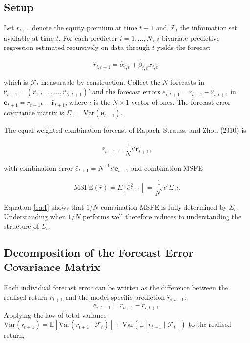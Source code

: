 \documentclass[a4paper,11pt]{article}
\begin{document}
\subsection{Setup}

Let $r_{t+1}$ denote the equity premium at time $t+1$ and $\mathcal{F}_t$ the information set available at time $t$. For each predictor $i = 1, \ldots, N$, a bivariate predictive regression estimated recursively on data through $t$ yields the forecast

\begin{equation*}
\hat{r}_{i,t+1} = \hat{\alpha}_{i,t} + \hat{\beta}_{i,t} x_{i,t},
\end{equation*}

\noindent which is $\mathcal{F}_t$-measurable by construction. Collect the $N$ forecasts in $\hat{\mathbf{r}}_{t+1} = (\hat{r}_{1,t+1}, \ldots, \hat{r}_{N,t+1})'$ and the forecast errors $e_{i,t+1} = r_{t+1} - \hat{r}_{i,t+1}$ in $\mathbf{e}_{t+1} = r_{t+1}\iota - \hat{\mathbf{r}}_{t+1}$, where $\iota$ is the $N \times 1$ vector of ones. The forecast error covariance matrix is $\Sigma_e = \mathrm{Var}(\mathbf{e}_{t+1})$.

The equal-weighted combination forecast of Rapach, Strauss, and Zhou (2010) is

\begin{equation*}
\bar{r}_{t+1} = \frac{1}{N} \iota' \hat{\mathbf{r}}_{t+1},
\end{equation*}

\noindent with combination error $\bar{e}_{t+1} = N^{-1} \iota' \mathbf{e}_{t+1}$ and combination MSFE

\begin{equation}
\mathrm{MSFE}(\bar{r}) = E[\bar{e}_{t+1}^2] = \frac{1}{N^2} \iota' \Sigma_e \iota. \label{eq:1}
\end{equation}

\noindent Equation \eqref{eq:1} shows that $1/N$ combination MSFE is fully determined by $\Sigma_e$. Understanding when $1/N$ performs well therefore reduces to understanding the structure of $\Sigma_e$.

\subsection{Decomposition of the Forecast Error Covariance Matrix}

Each individual forecast error can be written as the difference between the realised
return $r_{t+1}$ and the model-specific prediction $\hat{r}_{i,t+1}$:
\begin{equation}
    e_{i,t+1} = r_{t+1} - \hat{r}_{i,t+1}.
\end{equation}
Applying the law of total variance $\mathrm{Var}(r_{t+1}) =
\mathbb{E}[\mathrm{Var}(r_{t+1} \mid \mathcal{F}_t)] +
\mathrm{Var}(\mathbb{E}[r_{t+1} \mid \mathcal{F}_t])$ to the realised return,
\end{document}
